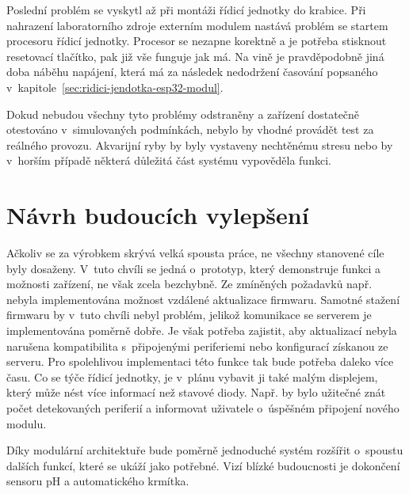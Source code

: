     Poslední problém se vyskytl až při montáži řídicí jednotky do krabice. Při nahrazení laboratorního zdroje externím modulem nastává problém se startem procesoru řídicí jednotky. Procesor se nezapne korektně a je potřeba stisknout resetovací tlačítko, pak již vše funguje jak má. Na vině je pravděpodobně jiná doba náběhu napájení, která má za následek nedodržení časování popsaného v~kapitole~\ref{sec:ridici-jendotka-esp32-modul}. 

    Dokud nebudou všechny tyto problémy odstraněny a zařízení dostatečně otestováno v~simulovaných podmínkách, nebylo by vhodné provádět test za reálného provozu. Akvarijní ryby by byly vystaveny nechtěnému stresu nebo by v~horším případě některá důležitá část systému vypověděla funkci. 

\section{Návrh budoucích vylepšení}
    Ačkoliv se za výrobkem skrývá velká spousta práce, ne všechny stanovené cíle byly dosaženy. V~tuto chvíli se jedná o~prototyp, který demonstruje funkci a možnosti zařízení, ne však zcela bezchybně. Ze zmíněných požadavků např. nebyla implementována možnost vzdálené aktualizace firmwaru. Samotné stažení firmwaru by v~tuto chvíli nebyl problém, jelikož komunikace se serverem je  implementována poměrně dobře. Je však potřeba zajistit, aby aktualizací nebyla narušena kompatibilita s~připojenými periferiemi nebo konfigurací získanou ze serveru. Pro spolehlivou implementaci této funkce tak bude potřeba daleko více času. Co se týče řídicí jednotky, je v~plánu vybavit ji také malým displejem, který může nést více informací než stavové diody. Např. by bylo užitečné znát počet detekovaných periferií a informovat uživatele o~úspěšném připojení nového modulu. 

    Díky modulární architektuře bude poměrně jednoduché systém rozšířit o~spoustu dalších funkcí, které se ukáží jako potřebné. Vizí blízké budoucnosti je dokončení sensoru pH a automatického krmítka.